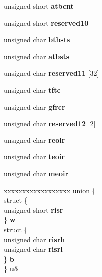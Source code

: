 \begin{DoxyCompactItemize}
unsigned short {\bfseries atbcnt}
\item 
\mbox{\label{structcd2401__regs___a50577f4673b3a7edcd71698ff66a90fa}} 
unsigned short {\bfseries reserved10}
\item 
\mbox{\label{structcd2401__regs___a56169894aace25adc0c78c0951deee05}} 
unsigned char {\bfseries btbsts}
\item 
\mbox{\label{structcd2401__regs___a77ef5ed3e27b6ba16f69a7844560ca2d}} 
unsigned char {\bfseries atbsts}
\item 
\mbox{\label{structcd2401__regs___a03330b0fa3980eae299b4a0cf5660127}} 
unsigned char {\bfseries reserved11} \mbox{[}32\mbox{]}
\item 
\mbox{\label{structcd2401__regs___ad1c899307e6738838bca37a4decb453c}} 
unsigned char {\bfseries tftc}
\item 
\mbox{\label{structcd2401__regs___ac113a5392dd6d8f06f44a4a8233d19d6}} 
unsigned char {\bfseries gfrcr}
\item 
\mbox{\label{structcd2401__regs___ab18d950a1f6b4da806dc88dfa3235bd8}} 
unsigned char {\bfseries reserved12} \mbox{[}2\mbox{]}
\item 
\mbox{\label{structcd2401__regs___af8beffdc53ef56b5124d83570c1ad8e3}} 
unsigned char {\bfseries reoir}
\item 
\mbox{\label{structcd2401__regs___ae860297d3ccf922e7d2c2d334b7a420f}} 
unsigned char {\bfseries teoir}
\item 
\mbox{\label{structcd2401__regs___abc01071cae15c00a5a0b5c37f22ce700}} 
unsigned char {\bfseries meoir}
\item 
\mbox{\label{structcd2401__regs___a82e05c8a2bcb2fa6b1b2ca866bfd719a}} 
\begin{tabbing}
xx\=xx\=xx\=xx\=xx\=xx\=xx\=xx\=xx\=\kill
union \{\\
\>struct \{\\
\>\>unsigned short {\bfseries risr}\\
\>\} {\bfseries w}\\
\>struct \{\\
\>\>unsigned char {\bfseries risrh}\\
\>\>unsigned char {\bfseries risrl}\\
\>\} {\bfseries b}\\
\} {\bfseries u5}\\


\end{tabbing}
\end{DoxyCompactItemize}
